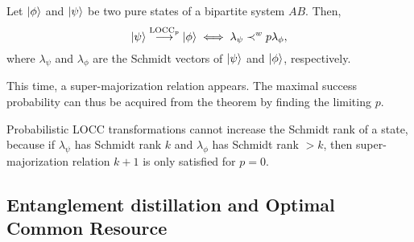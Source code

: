 \begin{theorem} \label{th:vidal}
    Let $\ket{\phi}$ and $\ket{\psi}$ be two pure states of a bipartite system $AB$. Then,
    \begin{equation}
        \ket{\psi} \overset{\text{LOCC}_p}{\longrightarrow} \ket{\phi} \iff \lambda_\psi \prec^w p \lambda_\phi,
    \end{equation}
    where $\lambda_\psi$ and $\lambda_\phi$ are the Schmidt vectors of $\ket{\psi}$ and $\ket{\phi}$, respectively.
\end{theorem}


\noindent This time, a super-majorization relation appears. The maximal success probability can thus be acquired from the theorem by finding the limiting $p$. 

\begin{corollary}
    Probabilistic LOCC transformations cannot increase the Schmidt rank of a state, because if $\lambda_\psi$ has Schmidt rank $k$ and $\lambda_\phi$ has Schmidt rank $> k$, then super-majorization relation $k+1$ is only satisfied for $p=0$.
\end{corollary}






\subsection{Entanglement distillation and Optimal Common Resource} \label{sec:OCR}

